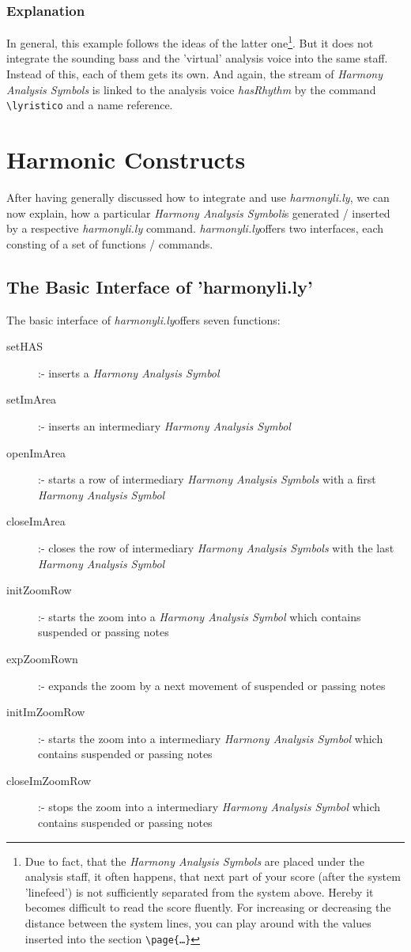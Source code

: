 \documentclass[
  DIV=calc,
  BCOR=5mm,
  12pt,
  headings=small,
  oneside,
  abstract=true,
  toc=bib,
  xcolor=dvipsnames,
  openany,
  ngerman,english]{scrartcl}
\newcommand{\acc}[0]{\textit}
\newcommand{\hlyn}[0]{\textit{harmonyli.ly}}
\newcommand{\has}[1]{\textit{Harmony Analysis Symbol#1}}
\begin{document}
\subsubsection{Explanation}

In general, this example follows the ideas of the latter one\footnote{Due to
fact, that the \has{s} are placed under the analysis staff, it often happens,
that next part of your score (after the system 'linefeed') is not sufficiently
separated from the system above. Hereby it becomes difficult to read the score
fluently. For increasing or decreasing the distance between the system lines,
you can play around with the values inserted into the section
\texttt{\textbackslash page\{\ldots\}}}. But it does not integrate the sounding
bass and the 'virtual' analysis voice into the same staff. Instead of this, each
of them gets its own. And again, the stream of \has{s} is linked to the
analysis voice \acc{hasRhythm} by the command \texttt{\textbackslash lyristico}
and a name reference.

\section{Harmonic Constructs}

After having generally discussed how to integrate and use \hlyn, we can now
explain, how a particular \has is generated / inserted by a respective \hlyn
command. \hlyn offers two interfaces, each consting of a set of functions / commands.

\subsection{The Basic Interface of 'harmonyli.ly'}

The basic interface of \hlyn offers seven functions:

\begin{description}
  \item[setHAS] :- inserts a \has{}
    \item[setImArea] :- inserts an intermediary \has{}
  \item[openImArea] :- starts a row of intermediary \has{s} with a first \has{}
  \item[closeImArea] :- closes the row of intermediary \has{s} with the last \has{}
  \item[initZoomRow] :- starts the zoom into a \has{} which contains suspended or
  passing notes
  \item[expZoomRown] :- expands the zoom by a next movement of suspended or
  passing notes
  \item[initImZoomRow] :- starts the zoom into a intermediary \has{} which
  contains suspended or passing notes 
  \item[closeImZoomRow] :- stops the zoom
  into a intermediary \has{} which contains suspended or passing notes
\end{description}
\end{document}
